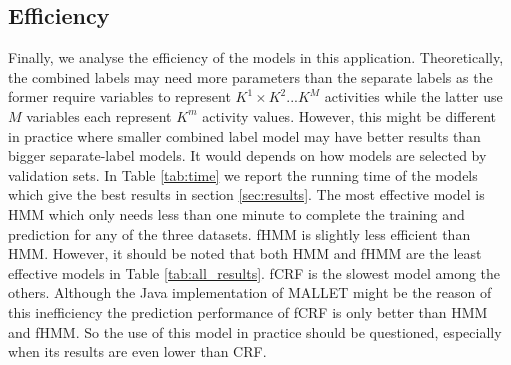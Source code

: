 \subsection{Efficiency}
Finally, we analyse the efficiency of the models in this application. Theoretically, the combined labels may need more parameters than the separate labels as the former require variables to represent $K^1\times K^2 ... K^M$ activities while the latter use $M$ variables each represent $K^m$ activity values. However, this might be different in practice where smaller combined label model may have better results than bigger separate-label models. It would depends on how models are selected by validation sets. In Table \ref{tab:time} we report the running time of the models which give the best results in section \ref{sec:results}. The most effective model is HMM which only needs less than one minute to complete the training and prediction for any of the three datasets. fHMM is slightly less efficient than HMM. However, it should be noted that both HMM and fHMM are the least effective models in Table \ref{tab:all_results}. fCRF is the slowest model among the others. Although the Java implementation of MALLET might be the reason of this inefficiency  the prediction performance of fCRF is only better than HMM and fHMM. So the use of this model in practice should be questioned, especially when its results are even lower than CRF.
